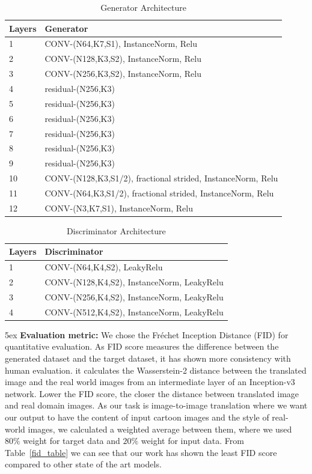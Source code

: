 \documentclass[runningheads]{llncs}
\begin{document}
\begin{table}[htbp]
\caption{Generator Architecture}
\label{gen_cyc}
\begin{tabular}{ll}
\hline
Layers &Generator\\
\hline
\hline
1 & CONV-(N64,K7,S1), InstanceNorm, Relu\\
2 & CONV-(N128,K3,S2), InstanceNorm, Relu\\
3 & CONV-(N256,K3,S2), InstanceNorm, Relu\\
4 & residual-(N256,K3)\\
5 & residual-(N256,K3)\\
6 & residual-(N256,K3)\\
7 & residual-(N256,K3)\\
8 & residual-(N256,K3)\\
9 & residual-(N256,K3)\\
10 & CONV-(N128,K3,S1/2), fractional strided, InstanceNorm, Relu\\
11 & CONV-(N64,K3,S1/2), fractional strided, InstanceNorm, Relu\\
12 & CONV-(N3,K7,S1), InstanceNorm, Relu\\
\hline
\hline
\end{tabular}
\end{table}

\begin{table}[htbp]
\caption{Discriminator Architecture}
\label{Patch_Disc}
\begin{tabular}{ll}
\hline
Layers &Discriminator \\
\hline
\hline
1 & CONV-(N64,K4,S2),  LeakyRelu \\
2 & CONV-(N128,K4,S2), InstanceNorm, LeakyRelu\\
3 & CONV-(N256,K4,S2), InstanceNorm, LeakyRelu\\
4 & CONV-(N512,K4,S2), InstanceNorm, LeakyRelu\\
\hline
\hline

\end{tabular}
\end{table}

\parindent 5ex \textbf{Evaluation metric:}
We chose the Fr\'echet Inception Distance (FID)\cite{DBLP:journals/corr/HeuselRUNKH17} for quantitative evaluation. As FID score measures the difference between the generated dataset and the target dataset, it has shown more consistency with human evaluation. it calculates the Wasserstein-2 distance between the translated image and the real world images from an intermediate layer of an Inception-v3 network. Lower the FID score, the closer the distance between translated image and real domain images. As our task is image-to-image translation where we want our output to have the content of input cartoon images and the style of real-world images, we calculated a weighted average between them, where we used $80\%$ weight for target data and $20\%$ weight for input data. From Table~\ref{fid_table} we can see that our work has shown the least FID score compared to other state of the art models.
\end{document}
